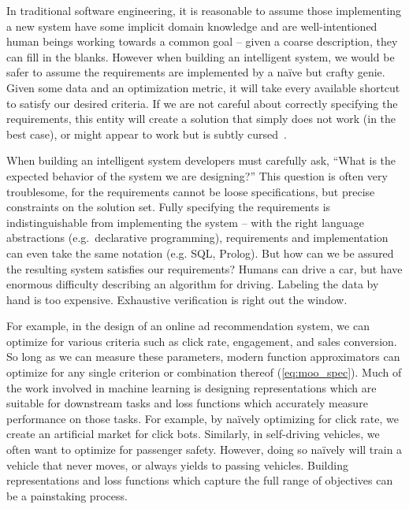In traditional software engineering, it is reasonable to assume those implementing a new system have some implicit domain knowledge and are well-intentioned human beings working towards a common goal -- given a coarse description, they can fill in the blanks. However when building an intelligent system, we would be safer to assume the requirements are implemented by a na\"ive but crafty genie. Given some data and an optimization metric, it will take every available shortcut to satisfy our desired criteria. If we are not careful about correctly specifying the requirements, this entity will create a solution that simply does not work (in the best case), or might appear to work but is subtly cursed~\citep{bellman1957dynamic}.

When building an intelligent system developers must carefully ask, ``What is the expected behavior of the system we are designing?'' This question is often very troublesome, for the requirements cannot be loose specifications, but precise constraints on the solution set. Fully specifying the requirements is indistinguishable from implementing the system -- with the right language abstractions (e.g.\ declarative programming), requirements and implementation can even take the same notation (e.g. SQL, Prolog). But how can we be assured the resulting system satisfies our requirements? Humans can drive a car, but have enormous difficulty describing an algorithm for driving. Labeling the data by hand is too expensive. Exhaustive verification is right out the window.

For example, in the design of an online ad recommendation system, we can optimize for various criteria such as click rate, engagement, and sales conversion. So long as we can measure these parameters, modern function approximators can optimize for any single criterion or combination thereof (\autoref{eq:moo_spec}). Much of the work involved in machine learning is designing representations which are suitable for downstream tasks and loss functions which accurately measure performance on those tasks. For example, by na\"ively optimizing for click rate, we create an artificial market for click bots. Similarly, in self-driving vehicles, we often want to optimize for passenger safety. However, doing so na\"ively will train a vehicle that never moves, or always yields to passing vehicles. Building representations and loss functions which capture the full range of objectives can be a painstaking process.

